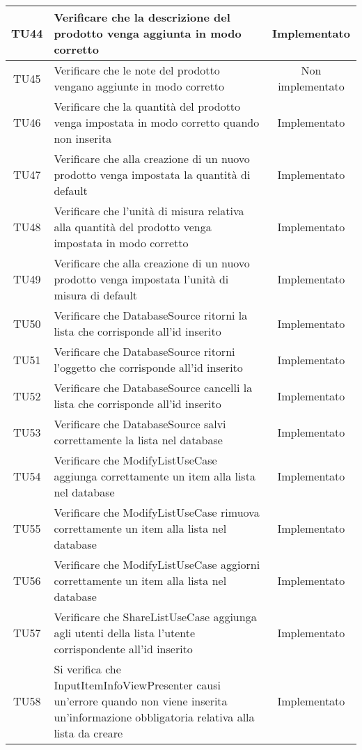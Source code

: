 \begin{center}
\begin{longtable}{|c|>{\centering}m{10cm}|c|}
		TU44 & Verificare che la descrizione del prodotto venga aggiunta in modo corretto & Implementato \\ \hline
		TU45 & Verificare che le note del prodotto vengano aggiunte in modo corretto & Non implementato \\ \hline
		TU46 & Verificare che la quantità del prodotto venga impostata in modo corretto quando non inserita & Implementato \\ \hline
		TU47 & Verificare che alla creazione di un nuovo prodotto venga impostata la quantità di default & Implementato \\ \hline
		TU48 & Verificare che l'unità di misura relativa alla quantità del prodotto venga impostata in modo corretto & Implementato \\ \hline
		TU49 & Verificare che alla creazione di un nuovo prodotto venga impostata l'unità di misura di default & Implementato \\ \hline
		TU50 & Verificare che DatabaseSource ritorni la lista che corrisponde all'id inserito & Implementato \\ \hline
		TU51 & Verificare che DatabaseSource ritorni l'oggetto che corrisponde all'id inserito & Implementato \\ \hline
		TU52 & Verificare che DatabaseSource cancelli la lista che corrisponde all'id inserito & Implementato \\ \hline
		TU53 & Verificare che DatabaseSource salvi correttamente la lista nel database & Implementato \\ \hline
		TU54 & Verificare che ModifyListUseCase aggiunga correttamente un item alla lista nel database & Implementato \\ \hline
		TU55 & Verificare che ModifyListUseCase rimuova correttamente un item alla lista nel database & Implementato \\ \hline
		TU56 & Verificare che ModifyListUseCase aggiorni correttamente un item alla lista nel database & Implementato \\ \hline
		TU57 & Verificare che ShareListUseCase aggiunga agli utenti della lista l’utente corrispondente all’id inserito & Implementato \\ \hline
		TU58 & Si verifica che InputItemInfoViewPresenter causi un'errore quando non viene inserita un'informazione obbligatoria relativa alla lista da creare & Implementato \\ \hline
	\end{longtable}
\end{center}
